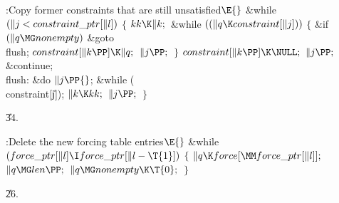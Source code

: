 \B{}:Copy former constraints that are still
unsatisfied\X${}\E{}$\6
\&{while} ${}(\|j<\\{constraint\_ptr}[\|l]){}$\5
${}\{{}$\1\6
${}\\{kk}\K\|k;{}$\6
\&{while} ${}((\|q\K\\{constraint}[\|j])){}$\5
${}\{{}$\1\6
\&{if} ${}(\|q\MG\\{nonempty}){}$\1\5
\&{goto} \\{flush};\2\6
${}\\{constraint}[\|k\PP]\K\|q;{}$\6
${}\|j\PP;{}$\6
\4${}\}{}$\2\6
${}\\{constraint}[\|k\PP]\K\NULL;{}$\6
${}\|j\PP;{}$\6
\&{continue};\6
\4\\{flush}:\5
\&{do}\5
${}\|j\PP{}$;\5
\5
\&{while} (\\{constraint}[\|j]);\6
${}\|k\K\\{kk};{}$\6
${}\|j\PP;{}$\6
\4${}\}{}$\2\par
\U34.\fi

\B{}:Delete the new forcing table entries\X${}\E{}$\6
\&{while} ${}(\\{force\_ptr}[\|l]\I\\{force\_ptr}[\|l-\T{1}]){}$\5
${}\{{}$\1\6
${}\|q\K\\{force}[\MM\\{force\_ptr}[\|l]];{}$\6
${}\|q\MG\\{len}\PP;{}$\6
${}\|q\MG\\{nonempty}\K\T{0};{}$\6
\4${}\}{}$\2\par
\U26.\fi

